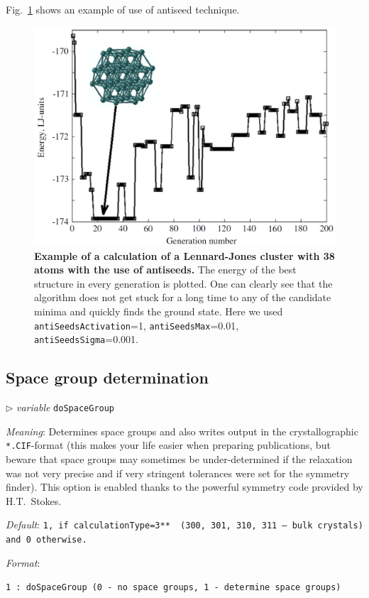 \documentclass[12pt]{article}
\newcommand{\keyword}[1]{\texttt{#1}}
\newcommand{\file}[1]{\texttt{#1}}
\newcommand{\paramacro}[6]{
\vspace{0.5cm}
$\triangleright$ \emph{variable} {\color{blue} \texttt{#1}}

\emph{Meaning}: {#2}

{#3}

\emph{Default}: \texttt{#4}

\emph{Format}:

{\addtolength{\leftskip}{10mm} 
\texttt{#5}
\par}


{\small #6}

}
\begin{document}
\vspace{0.5cm}

Fig.~\ref{fig:antiseeds} shows an example of use of antiseed technique.

\begin{figure}[h] \centering \includegraphics[scale=0.3]{pic/antiseeds}
\caption{\footnotesize \textbf{Example of a calculation of a Lennard-Jones
cluster with 38 atoms with the use of antiseeds.} The energy of the best
structure in every generation is plotted. One can clearly see that the algorithm
does not get stuck for a long time to any of the candidate minima and quickly
finds the ground state. Here we used \keyword{antiSeedsActivation}=1,
\keyword{antiSeedsMax}=0.01, \keyword{antiSeedsSigma}=0.001.}
\label{fig:antiseeds}
\end{figure}


\subsection{Space group determination} \label{input_space_groups}

\paramacro{doSpaceGroup}{Determines space groups and also writes output in the
crystallographic \file{*.CIF}-format (this makes your life easier when preparing
publications, but beware that space groups may sometimes be under-determined if
the relaxation was not very precise and if very stringent tolerances were set
for the symmetry finder). This option is enabled thanks to the powerful symmetry
code provided by H.T.~Stokes.}{}{1, {\rm if} \keyword{calculationType}=3** {\rm
(\texttt{300}, \texttt{301}, \texttt{310}, \texttt{311} --- bulk crystals) and}
0 {\rm otherwise.}}{1 : doSpaceGroup (0 - no space groups, 1 - determine space
groups)}{}
\end{document}
